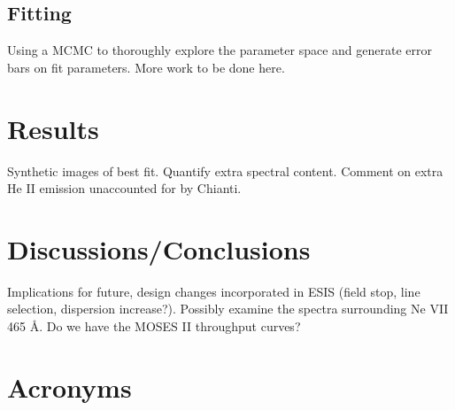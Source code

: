 \documentclass[]{solarphysics}
\begin{document}
\begin{article}
	\subsection{Fitting}
	Using a MCMC to thoroughly explore the parameter space and generate error bars on fit parameters. More work to be done here.

\section{Results}
	Synthetic images of best fit.  Quantify extra spectral content.  Comment on extra He II emission unaccounted for by Chianti. 

\section{Discussions/Conclusions}
	Implications for future, design changes incorporated in ESIS (field stop, line selection, dispersion increase?). Possibly examine the spectra surrounding Ne VII 465 \AA.  Do we have the MOSES II throughput curves? 
	


\section{Acronyms}
	\begin{acronym}
	\end{acronym}


\end{article}
\end{document}
